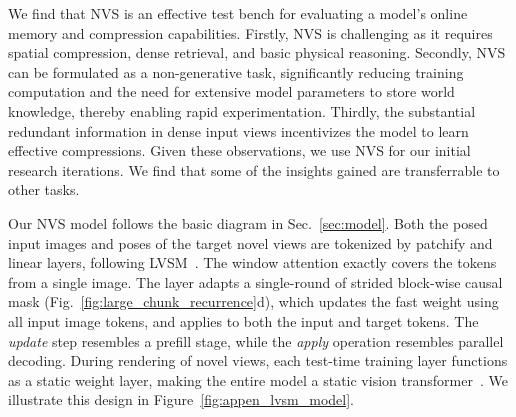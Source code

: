 We find that NVS is an effective test bench 
for evaluating a model's online memory and compression capabilities. 
Firstly, NVS is
challenging as it requires spatial compression, dense retrieval, and basic physical reasoning.
Secondly, NVS can be formulated as a non-generative task, significantly reducing training computation and the need for extensive model parameters to store world knowledge, thereby enabling rapid experimentation.
Thirdly, the substantial redundant information in dense input views incentivizes the model to learn effective compressions.
Given these observations, we use NVS for our initial research iterations. We find that some of the insights gained are transferrable to other tasks.





Our NVS model follows the basic \methodname{} diagram in Sec.~\ref{sec:model}.
Both the posed input images and poses of the target novel views are tokenized by patchify and linear layers, following LVSM~\cite{jin2024lvsm}.
The window attention exactly covers the tokens from a single image.
The \methodname{} layer adapts a single-round of strided block-wise causal mask (Fig.~\ref{fig:large_chunk_recurrence}d), which updates the fast weight using all input image tokens, and applies to both the input and target tokens. The \textit{update} step resembles a prefill stage,  while the \textit{apply} operation resembles parallel decoding. During rendering of novel views, each test-time training layer functions as a static weight layer, making the entire model a static vision transformer~\cite{dosovitskiy2020image}. We illustrate this design in Figure~\ref{fig:appen_lvsm_model}.

